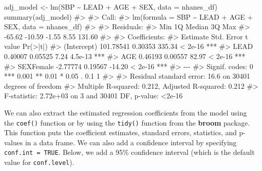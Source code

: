 \documentclass[
  letterpaper,
]{krantz}
\makeatletter
\newenvironment{Shaded}{\begin{snugshade}}{\end{snugshade}}
\newcommand{\AttributeTok}[1]{\textcolor[rgb]{0.40,0.45,0.13}{#1}}
\newcommand{\CommentTok}[1]{\textcolor[rgb]{0.37,0.37,0.37}{#1}}
\newcommand{\FunctionTok}[1]{\textcolor[rgb]{0.28,0.35,0.67}{#1}}
\newcommand{\NormalTok}[1]{\textcolor[rgb]{0.00,0.23,0.31}{#1}}
\newcommand{\OtherTok}[1]{\textcolor[rgb]{0.00,0.23,0.31}{#1}}
\newcommand{\SpecialCharTok}[1]{\textcolor[rgb]{0.37,0.37,0.37}{#1}}
\newenvironment{kframe}{%
\medskip{}
\setlength{\fboxsep}{.8em}
 \def\at@end@of@kframe{}%
 \ifinner\ifhmode%
  \def\at@end@of@kframe{\end{minipage}}%
  \begin{minipage}{\columnwidth}%
 \fi\fi%
 \def\FrameCommand##1{\hskip\@totalleftmargin \hskip-\fboxsep
 \colorbox{shadecolor}{##1}\hskip-\fboxsep
     \hskip-\linewidth \hskip-\@totalleftmargin \hskip\columnwidth}%
 \MakeFramed {\advance\hsize-\width
   \@totalleftmargin\z@ \linewidth\hsize
   \@setminipage}}%
 {\par\unskip\endMakeFramed%
 \at@end@of@kframe}
\renewenvironment{Shaded}{\begin{kframe}}{\end{kframe}}
\makeatother
\begin{document}
\begin{Shaded}
\begin{Highlighting}[]
\NormalTok{adj\_model }\OtherTok{\textless{}{-}} \FunctionTok{lm}\NormalTok{(SBP }\SpecialCharTok{\textasciitilde{}}\NormalTok{ LEAD }\SpecialCharTok{+}\NormalTok{ AGE }\SpecialCharTok{+}\NormalTok{ SEX, }\AttributeTok{data =}\NormalTok{ nhanes\_df)}
\FunctionTok{summary}\NormalTok{(adj\_model)}
\CommentTok{\#\textgreater{} }
\CommentTok{\#\textgreater{} Call:}
\CommentTok{\#\textgreater{} lm(formula = SBP \textasciitilde{} LEAD + AGE + SEX, data = nhanes\_df)}
\CommentTok{\#\textgreater{} }
\CommentTok{\#\textgreater{} Residuals:}
\CommentTok{\#\textgreater{}    Min     1Q Median     3Q    Max }
\CommentTok{\#\textgreater{} {-}65.62 {-}10.59  {-}1.55   8.55 131.60 }
\CommentTok{\#\textgreater{} }
\CommentTok{\#\textgreater{} Coefficients:}
\CommentTok{\#\textgreater{}              Estimate Std. Error t value Pr(\textgreater{}|t|)    }
\CommentTok{\#\textgreater{} (Intercept) 101.78541    0.30353  335.34  \textless{} 2e{-}16 ***}
\CommentTok{\#\textgreater{} LEAD          0.40007    0.05525    7.24  4.5e{-}13 ***}
\CommentTok{\#\textgreater{} AGE           0.46193    0.00557   82.97  \textless{} 2e{-}16 ***}
\CommentTok{\#\textgreater{} SEXFemale    {-}2.77774    0.19567  {-}14.20  \textless{} 2e{-}16 ***}
\CommentTok{\#\textgreater{} {-}{-}{-}}
\CommentTok{\#\textgreater{} Signif. codes:  0 \textquotesingle{}***\textquotesingle{} 0.001 \textquotesingle{}**\textquotesingle{} 0.01 \textquotesingle{}*\textquotesingle{} 0.05 \textquotesingle{}.\textquotesingle{} 0.1 \textquotesingle{} \textquotesingle{} 1}
\CommentTok{\#\textgreater{} }
\CommentTok{\#\textgreater{} Residual standard error: 16.6 on 30401 degrees of freedom}
\CommentTok{\#\textgreater{} Multiple R{-}squared:  0.212,  Adjusted R{-}squared:  0.212 }
\CommentTok{\#\textgreater{} F{-}statistic: 2.72e+03 on 3 and 30401 DF,  p{-}value: \textless{}2e{-}16}
\end{Highlighting}
\end{Shaded}

We can also extract the estimated regression coefficients from the model
using the \texttt{coef()} function or by using the \texttt{tidy()}
function from the \textbf{broom} package. This function puts the
coefficient estimates, standard errors, statistics, and p-values in a
data frame. We can also add a confidence interval by specifying
\texttt{conf.int\ =\ TRUE}. Below, we add a 95\% confidence interval
(which is the default value for \texttt{conf.level}).
\end{document}
